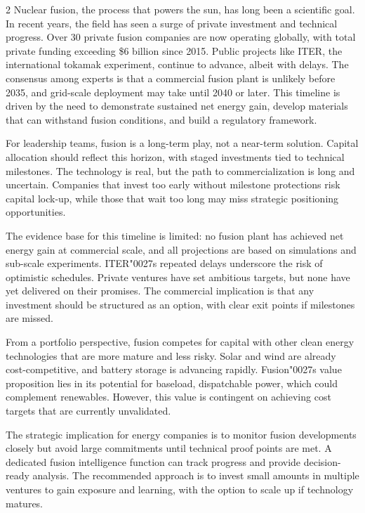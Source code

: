 \documentclass[10pt,a4paper]{article}
\newcommand{\BOApos}{{\BOQuoteFont\char"0027}}
\begin{document}
\begin{multicols}{2}
{\small Nuclear fusion, the process that powers the sun, has long been a scientific goal. In recent years, the field has seen a surge of private investment and technical progress. Over 30 private fusion companies are now operating globally, with total private funding exceeding \$6 billion since 2015. Public projects like ITER, the international tokamak experiment, continue to advance, albeit with delays. The consensus among experts is that a commercial fusion plant is unlikely before 2035, and grid-scale deployment may take until 2040 or later. This timeline is driven by the need to demonstrate sustained net energy gain, develop materials that can withstand fusion conditions, and build a regulatory framework.}\par
{\small For leadership teams, fusion is a long-term play, not a near-term solution. Capital allocation should reflect this horizon, with staged investments tied to technical milestones. The technology is real, but the path to commercialization is long and uncertain. Companies that invest too early without milestone protections risk capital lock-up, while those that wait too long may miss strategic positioning opportunities.}\par
{\small The evidence base for this timeline is limited: no fusion plant has achieved net energy gain at commercial scale, and all projections are based on simulations and sub-scale experiments. ITER\BOApos{}s repeated delays underscore the risk of optimistic schedules. Private ventures have set ambitious targets, but none have yet delivered on their promises. The commercial implication is that any investment should be structured as an option, with clear exit points if milestones are missed.}\par
{\small From a portfolio perspective, fusion competes for capital with other clean energy technologies that are more mature and less risky. Solar and wind are already cost-competitive, and battery storage is advancing rapidly. Fusion\BOApos{}s value proposition lies in its potential for baseload, dispatchable power, which could complement renewables. However, this value is contingent on achieving cost targets that are currently unvalidated.}\par
{\small The strategic implication for energy companies is to monitor fusion developments closely but avoid large commitments until technical proof points are met. A dedicated fusion intelligence function can track progress and provide decision-ready analysis. The recommended approach is to invest small amounts in multiple ventures to gain exposure and learning, with the option to scale up if technology matures.}\par
\end{multicols}
\label{chap:1:end}
\end{document}
